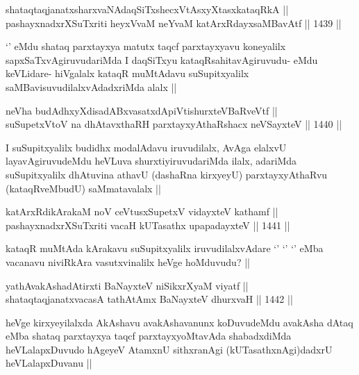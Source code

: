 \begin{shl}
shataqtaqjanatxsharxvaNAdaqSiTxshecxVtAsxyXtasxkataqRkA || \\
pashayxnadxrXSuTxriti heyxVvaM neYvaM katArxRdayxsaMBavAtf ||  1439 || 
\end{shl}

\begin{artha}
`\stext' eMdu shataq parxtayxya matutx taqcf parxtayxyavu koneyalilx sapxSaTxvAgiruvudariMda I daqSiTxyu kataqRsahitavAgiruvudu- eMdu keVLidare- hiVgalalx kataqR muMtAdavu suSupitxyalilx saMBavisuvudilalxvAdadxriMda alalx ||
\end{artha}

\begin{shl}
neVha budAdhxyXdisadABxvasatxdA\s piVtishurxteVBaRveVtf ||  \\
suSupetxV\s toV na dhAtavxthaRH parxtayxyAthaRshacx neVSayxteV ||  1440 || 
\end{shl}

\begin{artha}
I suSupitxyalilx budidhx modalAdavu iruvudilalx, AvAga elalxvU layavAgiruvudeMdu heVLuva shurxtiyiruvudariMda ilalx, adariMda suSupitxyalilx dhAtuvina athavU (dashaRna kirxyeyU) parxtayxyAthaRvu (kataqRveMbudU) saMmatavalalx ||
\end{artha}


\begin{shl}
katArxRdikArakaM noV ceVtusxSupetxV vidayxteV kathamf || \\
pashayxnadxrXSuTxriti vacaH kUTasathx upapadayxteV ||  1441 ||  
\end{shl}

\begin{artha}
kataqR muMtAda kArakavu suSupitxyalilx iruvudilalxvAdare `\stext' `\stext' `\stext' eMba vacanavu niviRkAra vasutxvinalilx heVge hoMduvudu? ||
\end{artha}

\begin{shl}
yathA\s vakAshadAtirxti BaNayxteV niSikxrXyaM viyatf ||  \\
shataqtaqjanatxvacasA tathA\s \s tAmx BaNayxteV dhurxvaH ||  1442 ||  
\end{shl}

\begin{artha}
heVge kirxyeyilalxda AkAshavu avakAshavanunx koDuvudeMdu avakAsha dAtaq eMba shataq parxtayxya taqcf parxtayxyoMtavAda shabadxdiMda heVLalapxDuvudo hAgeyeV AtamxnU sithxranAgi (kUTasathxnAgi)dadxrU heVLalapxDuvanu ||
\end{artha}

